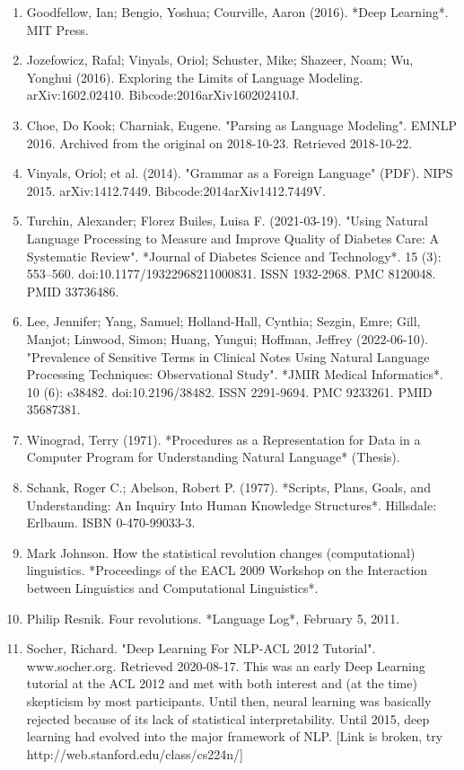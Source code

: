 \begin{enumerate}
\item Goodfellow, Ian; Bengio, Yoshua; Courville, Aaron (2016). *Deep Learning*. MIT Press.  
\item Jozefowicz, Rafal; Vinyals, Oriol; Schuster, Mike; Shazeer, Noam; Wu, Yonghui (2016). Exploring the Limits of Language Modeling. arXiv:1602.02410. Bibcode:2016arXiv160202410J.  
\item Choe, Do Kook; Charniak, Eugene. "Parsing as Language Modeling". EMNLP 2016. Archived from the original on 2018-10-23. Retrieved 2018-10-22.  
\item Vinyals, Oriol; et al. (2014). "Grammar as a Foreign Language" (PDF). NIPS 2015. arXiv:1412.7449. Bibcode:2014arXiv1412.7449V.  
\item Turchin, Alexander; Florez Builes, Luisa F. (2021-03-19). "Using Natural Language Processing to Measure and Improve Quality of Diabetes Care: A Systematic Review". *Journal of Diabetes Science and Technology*. 15 (3): 553–560. doi:10.1177/19322968211000831. ISSN 1932-2968. PMC 8120048. PMID 33736486.  
\item Lee, Jennifer; Yang, Samuel; Holland-Hall, Cynthia; Sezgin, Emre; Gill, Manjot; Linwood, Simon; Huang, Yungui; Hoffman, Jeffrey (2022-06-10). "Prevalence of Sensitive Terms in Clinical Notes Using Natural Language Processing Techniques: Observational Study". *JMIR Medical Informatics*. 10 (6): e38482. doi:10.2196/38482. ISSN 2291-9694. PMC 9233261. PMID 35687381.  
\item Winograd, Terry (1971). *Procedures as a Representation for Data in a Computer Program for Understanding Natural Language* (Thesis).  
\item Schank, Roger C.; Abelson, Robert P. (1977). *Scripts, Plans, Goals, and Understanding: An Inquiry Into Human Knowledge Structures*. Hillsdale: Erlbaum. ISBN 0-470-99033-3.  
\item Mark Johnson. How the statistical revolution changes (computational) linguistics. *Proceedings of the EACL 2009 Workshop on the Interaction between Linguistics and Computational Linguistics*.
\item Philip Resnik. Four revolutions. *Language Log*, February 5, 2011.  
\item Socher, Richard. "Deep Learning For NLP-ACL 2012 Tutorial". www.socher.org. Retrieved 2020-08-17. This was an early Deep Learning tutorial at the ACL 2012 and met with both interest and (at the time) skepticism by most participants. Until then, neural learning was basically rejected because of its lack of statistical interpretability. Until 2015, deep learning had evolved into the major framework of NLP. [Link is broken, try http://web.stanford.edu/class/cs224n/]  

\end{enumerate}
